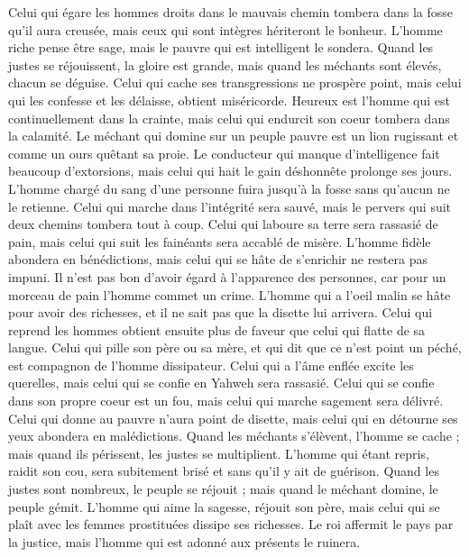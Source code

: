 \begin{multicols}{2}
Celui qui égare les hommes droits dans le mauvais chemin tombera dans la fosse qu'il aura creusée, mais ceux qui sont intègres hériteront le bonheur.
L'homme riche pense être sage, mais le pauvre qui est intelligent le sondera.
Quand les justes se réjouissent, la gloire est grande, mais quand les méchants sont élevés, chacun se déguise.
Celui qui cache ses transgressions ne prospère point, mais celui qui les confesse et les délaisse, obtient miséricorde.
Heureux est l'homme qui est continuellement dans la crainte, mais celui qui endurcit son coeur tombera dans la calamité.
Le méchant qui domine sur un peuple pauvre est un lion rugissant et comme un ours quêtant sa proie.
Le conducteur qui manque d'intelligence fait beaucoup d'extorsions, mais celui qui hait le gain déshonnête prolonge ses jours.
L'homme chargé du sang d'une personne fuira jusqu'à la fosse sans qu'aucun ne le retienne.
Celui qui marche dans l'intégrité sera sauvé, mais le pervers qui suit deux chemins tombera tout à coup.
Celui qui laboure sa terre sera rassasié de pain, mais celui qui suit les fainéants sera accablé de misère.
L'homme fidèle abondera en bénédictions, mais celui qui se hâte de s'enrichir ne restera pas impuni.
Il n'est pas bon d'avoir égard à l'apparence des personnes, car pour un morceau de pain l'homme commet un crime.
L'homme qui a l'oeil malin se hâte pour avoir des richesses, et il ne sait pas que la disette lui arrivera.
Celui qui reprend les hommes obtient ensuite plus de faveur que celui qui flatte de sa langue.
Celui qui pille son père ou sa mère, et qui dit que ce n'est point un péché, est compagnon de l'homme dissipateur.
Celui qui a l’âme enflée excite les querelles, mais celui qui se confie en Yahweh sera rassasié.
Celui qui se confie dans son propre coeur est un fou, mais celui qui marche sagement sera délivré.
Celui qui donne au pauvre n'aura point de disette, mais celui qui en détourne ses yeux abondera en malédictions.
Quand les méchants s'élèvent, l'homme se cache ; mais quand ils périssent, les justes se multiplient.
\VerseOne{}L'homme qui étant repris, raidit son cou, sera subitement brisé et sans qu'il y ait de guérison.
Quand les justes sont nombreux, le peuple se réjouit ; mais quand le méchant domine, le peuple gémit.
L'homme qui aime la sagesse, réjouit son père, mais celui qui se plaît avec les femmes prostituées dissipe ses richesses.
Le roi affermit le pays par la justice, mais l'homme qui est adonné aux présents le ruinera.

\end{multicols}

